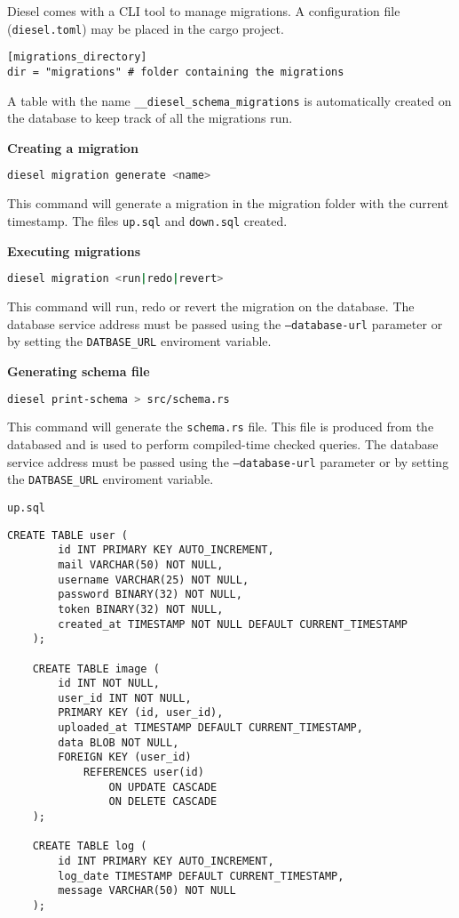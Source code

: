 \documentclass[../documentation.tex]{subfiles}
\begin{document}
Diesel comes with a CLI tool to manage migrations.
A configuration file (\texttt{diesel.toml}) may be placed in the cargo project.

\begin{lstlisting}
[migrations_directory]
dir = "migrations" # folder containing the migrations
\end{lstlisting}

A table with the name \texttt{\_\_diesel\_schema\_migrations}
is automatically created on the database to keep track of all the migrations
run.


\textbf{Creating a migration}
\begin{lstlisting}[language=bash]
    diesel migration generate <name>
\end{lstlisting}
This command will generate a migration in the migration folder with the current timestamp.
The files \texttt{up.sql} and \texttt{down.sql} created.

\textbf{Executing migrations}
\begin{lstlisting}[language=bash]
    diesel migration <run|redo|revert>
\end{lstlisting}
This command will run, redo or revert the migration on the database.
The database service address must be passed using
the \texttt{--database-url} parameter or by setting the \texttt{DATBASE\_URL}
enviroment variable.

\textbf{Generating schema file}
\begin{lstlisting}[language=bash]
    diesel print-schema > src/schema.rs
\end{lstlisting}
This command will generate the \texttt{schema.rs} file.
This file is produced from the databased and is used to
perform compiled-time checked queries.
The database service address must be passed using
the \texttt{--database-url} parameter or by setting the \texttt{DATBASE\_URL}
enviroment variable.

\pagebreak

\texttt{up.sql}
\begin{lstlisting}[style=sql]
    CREATE TABLE user (
        id INT PRIMARY KEY AUTO_INCREMENT,
        mail VARCHAR(50) NOT NULL,
        username VARCHAR(25) NOT NULL,
        password BINARY(32) NOT NULL,
        token BINARY(32) NOT NULL,
        created_at TIMESTAMP NOT NULL DEFAULT CURRENT_TIMESTAMP
    );
    
    CREATE TABLE image (
        id INT NOT NULL,
        user_id INT NOT NULL,
        PRIMARY KEY (id, user_id),
        uploaded_at TIMESTAMP DEFAULT CURRENT_TIMESTAMP,
        data BLOB NOT NULL,
        FOREIGN KEY (user_id)
            REFERENCES user(id)
                ON UPDATE CASCADE
                ON DELETE CASCADE
    );
    
    CREATE TABLE log (
        id INT PRIMARY KEY AUTO_INCREMENT,
        log_date TIMESTAMP DEFAULT CURRENT_TIMESTAMP,
        message VARCHAR(50) NOT NULL
    );
\end{lstlisting}
\end{document}
